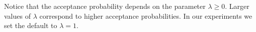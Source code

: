 \documentclass[11pt,a4paper]{article}
\begin{document}
Notice that the acceptance probability depends on the parameter $\lambda\geq0.$ Larger values of $\lambda$ correspond to higher acceptance probabilities. In our experiments we set the default to $\lambda=1.$

\end{document}
